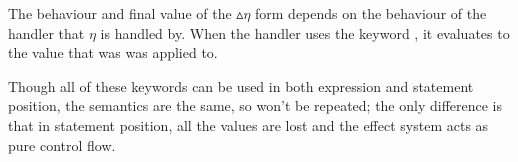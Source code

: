 The behaviour and final value of the $\vartriangle\eta$ form depends on the
behaviour of the handler that $\eta$ is handled by. When the handler uses
the keyword , it evaluates to the value that was  was
applied to.

\begin{prooftree}
\end{prooftree}

Though all of these keywords can be used in both expression and statement
position, the semantics are the same, so won't be repeated; the only difference
is that in statement position, all the values are lost and the effect system
acts as pure control flow.
